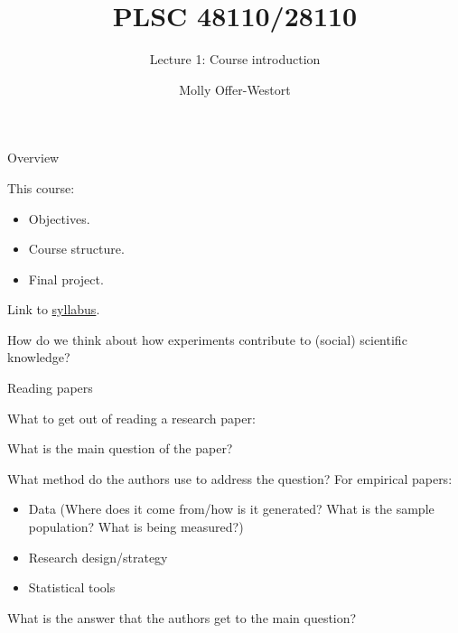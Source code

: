 \documentclass[xcolor={dvipsnames},handout]{beamer}
\title{PLSC 48110/28110}
\subtitle{Lecture 1: Course introduction}
\date{}
\author{Molly Offer-Westort}
\institute{Department of Political Science, \\University of Chicago}
\begin{document}
\frame{\titlepage
\thispagestyle{empty}
}
\begin{frame}{Overview}

This course:
\begin{itemize}
\item Objectives. 
\item Course structure. 
\item Final project. 
\end{itemize}
\vskip 0.5cm




Link to \href{../syllabus/syllabus.pdf}{syllabus}.

\end{frame}



\begin{frame}[c]{}

How do we think about how experiments contribute to (social) scientific knowledge?

\end{frame}



\begin{frame}{Reading papers}

 What to get out of reading a research paper:
\begin{itemize}
\item What is the main question of the paper?
\item What method do the authors use to address the question?
For empirical papers:
\begin{itemize}
\item Data (Where does it come from/how is it generated? What is the sample population? What is being measured?)
\item Research design/strategy
\item Statistical tools
\end{itemize}
{
\item What is the answer that the authors get to the main question?}
\end{itemize}

\end{frame}
\end{document}
